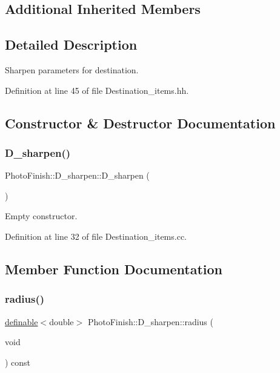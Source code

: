 \subsection*{Additional Inherited Members}


\subsection{Detailed Description}
Sharpen parameters for destination. 

Definition at line 45 of file Destination\+\_\+items.\+hh.



\subsection{Constructor \& Destructor Documentation}
\mbox{\label{class_photo_finish_1_1_d__sharpen_a2b51c49b0deff669e873d4871173fa45}} 
\subsubsection{\texorpdfstring{D\+\_\+sharpen()}{D\_sharpen()}}
{\footnotesize\ttfamily Photo\+Finish\+::\+D\+\_\+sharpen\+::\+D\+\_\+sharpen (\begin{DoxyParamCaption}{ }\end{DoxyParamCaption})}



Empty constructor. 



Definition at line 32 of file Destination\+\_\+items.\+cc.



\subsection{Member Function Documentation}
\mbox{\label{class_photo_finish_1_1_d__sharpen_a0eff26c87d91068950042b810bd45144}} 
\subsubsection{\texorpdfstring{radius()}{radius()}}
{\footnotesize\ttfamily \hyperlink{class_photo_finish_1_1definable}{definable}$<$double$>$ Photo\+Finish\+::\+D\+\_\+sharpen\+::radius (\begin{DoxyParamCaption}\item[{void}]{ }\end{DoxyParamCaption}) const\hspace{0.3cm}{\ttfamily [inline]}}



